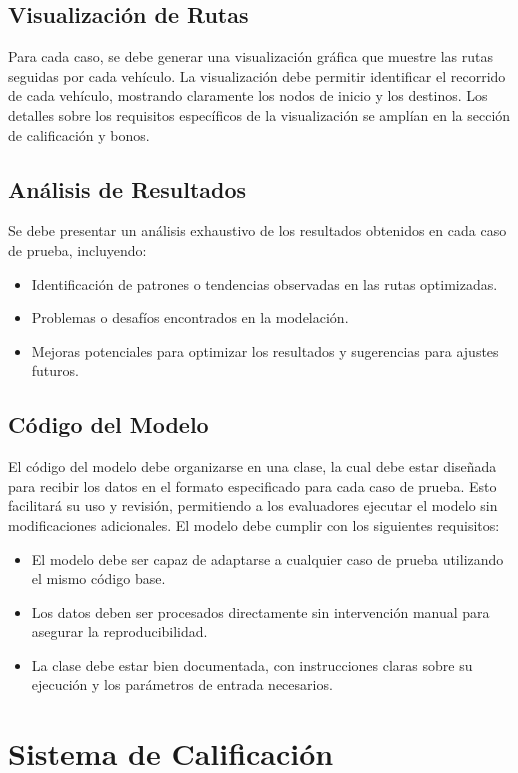 \documentclass[12pt]{article}
\begin{document}
\subsection{Visualización de Rutas}
Para cada caso, se debe generar una visualización gráfica que muestre las rutas seguidas por cada vehículo. La visualización debe permitir identificar el recorrido de cada vehículo, mostrando claramente los nodos de inicio y los destinos. Los detalles sobre los requisitos específicos de la visualización se amplían en la sección de calificación y bonos.

\subsection{Análisis de Resultados}
Se debe presentar un análisis exhaustivo de los resultados obtenidos en cada caso de prueba, incluyendo:
\begin{itemize}
    \item Identificación de patrones o tendencias observadas en las rutas optimizadas.
    \item Problemas o desafíos encontrados en la modelación.
    \item Mejoras potenciales para optimizar los resultados y sugerencias para ajustes futuros.
\end{itemize}

\subsection{Código del Modelo}
El código del modelo debe organizarse en una clase, la cual debe estar diseñada para recibir los datos en el formato especificado para cada caso de prueba. Esto facilitará su uso y revisión, permitiendo a los evaluadores ejecutar el modelo sin modificaciones adicionales. El modelo debe cumplir con los siguientes requisitos:
\begin{itemize}
    \item El modelo debe ser capaz de adaptarse a cualquier caso de prueba utilizando el mismo código base.
    \item Los datos deben ser procesados directamente sin intervención manual para asegurar la reproducibilidad.
    \item La clase debe estar bien documentada, con instrucciones claras sobre su ejecución y los parámetros de entrada necesarios.
\end{itemize}

\bigskip

\section{Sistema de Calificación}
\end{document}
